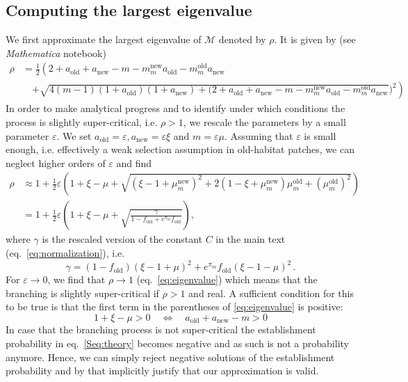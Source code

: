 \documentclass[11pt]{article}
\begin{document}
\subsection{Computing the largest eigenvalue}
We first approximate the largest eigenvalue of $\mathcal{M}$ denoted by $\rho$. It is given by (see \textit{Mathematica} notebook)
\begin{equation}
\begin{aligned}
\rho &= \frac{1}{2}\left(2 + a_{\text{old}} + a_{\text{new}} - m -  m_m^{\text{new}} a_{\text{old}} - m_m^{\text{old}} a_{\text{new}} \right.\\
&\quad \left. + \sqrt{4 (m -1) (1+a_{\text{old}})(1+a_{\text{new}}) + (2+a_{\text{old}} + a_{\text{new}} - m - m_m^{\text{new}} a_{\text{old}} - m_m^{\text{old}} a_{\text{new}}})^2 \right)
\end{aligned}
\end{equation}
%
In order to make analytical progress and to identify under which conditions the process is slightly super-critical, i.e. $\rho>1$, we rescale the parameters by a small parameter $\varepsilon$. We set $a_{\text{old}} = \varepsilon, a_{\text{new}} = \varepsilon \xi$ and $m = \varepsilon\mu$. Assuming that $\varepsilon$ is small enough, i.e. effectively a weak selection assumption in old-habitat patches, we can neglect higher orders of $\varepsilon$ and find
\begin{equation}\label{eq:eigenvalue}
\begin{aligned}
\rho &\approx 1+\frac{1}{2}\varepsilon\left(1+ \xi - \mu + \sqrt{(\xi -1 + \mu_m^{\text{new}})^2 + 2(1-\xi+\mu_m^{\text{new}})\mu_m^{\text{old}} + (\mu_m^{\text{old}})^2  }\right)\\
&= 1+\frac{1}{2}\varepsilon\left(1+ \xi - \mu + \sqrt{\frac{\gamma}{1-f_{\text{old}}+ e^{\pi_m} f_{\text{old}}}  }\right),
\end{aligned}
\end{equation}
where $\gamma$ is the rescaled version of the constant $C$ in the main text (eq.~\eqref{eq:normalization}), i.e.
\begin{equation}
\gamma = (1-f_{\text{old}})(\xi-1+\mu)^2 +  e^{\pi_m} f_{\text{old}} (\xi-1-\mu)^2\, .
\end{equation}
%
For $\varepsilon\to 0$, we find that $\rho\to 1$ (eq.~\eqref{eq:eigenvalue}) which means that the branching is slightly super-critical if $\rho>1$ and real. A sufficient condition for this to be true is that the first term in the parentheses of \eqref{eq:eigenvalue} is positive:
\begin{equation}
1+\xi-\mu > 0 \quad \Leftrightarrow \quad a_{\text{old}} + a_{\text{new}} - m > 0
\end{equation}
%
In case that the branching process is not super-critical the establishment probability in eq.~\eqref{Seq:theory} becomes negative and as such is not a probability anymore. Hence, we can simply reject negative solutions of the establishment probability and by that implicitly justify that our approximation is valid.%
\end{document}
